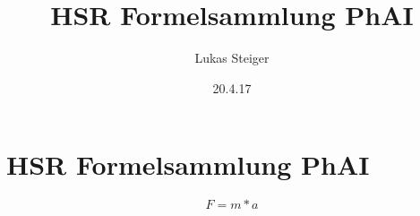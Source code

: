 \documentclass{article}
\author{Lukas Steiger}
\title{HSR Formelsammlung PhAI}
\date{20.4.17}
\begin{document}
	\part{HSR Formelsammlung PhAI}
	\begin{equation}
		F = m * a
	\end{equation}
\end{document}
